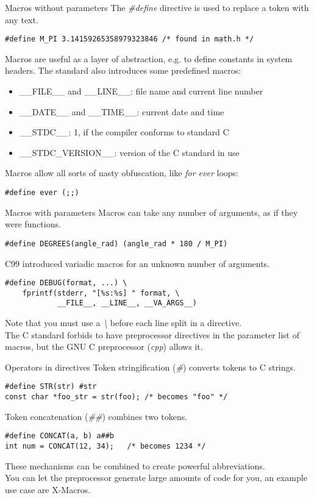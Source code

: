 \begin{frame}[fragile]{Macros without parameters}
	The \textit{\#define} directive is used to replace a token with any text.
	\begin{lstlisting}[numbers=none]
#define M_PI 3.14159265358979323846	/* found in math.h */
\end{lstlisting}
	\bigskip
	Macros are useful as a layer of abstraction, e.g. to define constants in system headers.
	The standard also introduces some predefined macros:
	\begin{itemize}
		\item \_\_FILE\_\_ and \_\_LINE\_\_: file name and current line number
		\item \_\_DATE\_\_ and \_\_TIME\_\_: current date and time
		\item \_\_STDC\_\_: 1, if the compiler conforms to standard C
		\item \_\_STDC\_VERSION\_\_: version of the C standard in use
	\end{itemize}
	\bigskip
	Macros allow all sorts of nasty obfuscation, like \textit{for ever} loops:
	\begin{lstlisting}[numbers=none]
#define ever (;;)
\end{lstlisting}
\end{frame}

\begin{frame}[fragile]{Macros with parameters}
	Macros can take any number of arguments, as if they were functions.
	\begin{lstlisting}[numbers=none]
#define DEGREES(angle_rad) (angle_rad * 180 / M_PI)
\end{lstlisting}
	\bigskip
	C99 introduced variadic macros for an unknown number of arguments.
	\begin{lstlisting}[numbers=none]
#define DEBUG(format, ...) \
	fprintf(stderr, "[%s:%s] " format, \
			__FILE__, __LINE__, __VA_ARGS__)
\end{lstlisting}
	\bigskip
	Note that you must use a \textit{\textbackslash} before each line split in a directive.\\
	\bigskip
	The C standard forbids to have preprocessor directives in the parameter list
	of macros, but the GNU C preprocessor (\textit{cpp}) allows it.
\end{frame}

\begin{frame}[fragile]{Operators in directives}
	Token stringification (\textit{\#}) converts tokens to C strings.
	\begin{lstlisting}[numbers=none]
#define STR(str) #str
const char *foo_str = str(foo);	/* becomes "foo" */
\end{lstlisting}
	\bigskip
	Token concatenation (\textit{\#\#}) combines two tokens.
\begin{lstlisting}[numbers=none]
#define CONCAT(a, b) a##b
int num = CONCAT(12, 34);	/* becomes 1234 */
\end{lstlisting}
	\bigskip
	These mechanisms can be combined to create powerful abbreviations.\\
	\bigskip
	You can let the preprocessor generate large amounts of code for you,
	an example use case are X-Macros.
\end{frame}

